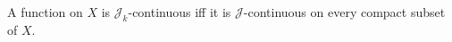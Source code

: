 A function on $X$ is $\mathcal{J}_k$-continuous iff it is $\mathcal{J}$-continuous on every compact subset of $X$.

